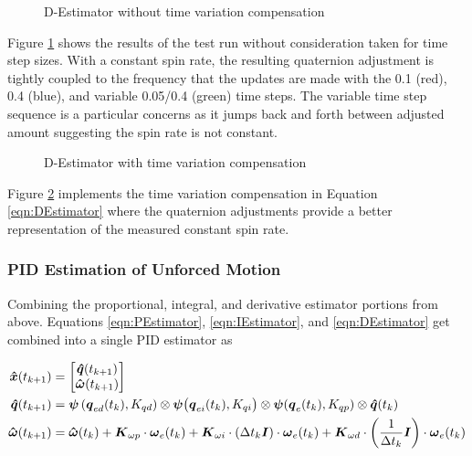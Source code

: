 \begin{figure}[H]
  \centerline{}
  \caption{D-Estimator without time variation compensation}
  \label{fig:DEstimatorwithouttimevariationcompensation}
\end{figure}

Figure \ref{fig:DEstimatorwithouttimevariationcompensation} shows the results of the test run without consideration taken for time step sizes.  With a constant spin rate, the resulting quaternion adjustment is tightly coupled to the frequency that the updates are made with the 0.1 (red), 0.4 (blue), and variable 0.05/0.4 (green) time steps.  The variable time step sequence is a particular concerns as it jumps back and forth between adjusted amount suggesting the spin rate is not constant.

\begin{figure}[H]
  \centerline{}
  \caption{D-Estimator with time variation compensation}
  \label{fig:DEstimatorwithtimevariationcompensation}
\end{figure}

Figure \ref{fig:DEstimatorwithtimevariationcompensation} implements the time variation compensation in Equation \ref{eqn:DEstimator} where the quaternion adjustments provide a better representation of the measured constant spin rate.

\subsubsection{PID Estimation of Unforced Motion}
\label{subsubsec:PIDEstimatorofUnforcedMotion}

Combining the proportional, integral, and derivative estimator portions from above.  Equations \ref{eqn:PEstimator}, \ref{eqn:IEstimator}, and \ref{eqn:DEstimator} get combined into a single PID estimator as

\begin{subequations}
  \begin{align}
    \boldsymbol{\hat{x}}(t_{k+1}) &= \begin{bmatrix} \boldsymbol{\hat{q}}(t_{k+1}) \\ \boldsymbol{\hat{\omega}}(t_{k+1}) \end{bmatrix} \\
    \boldsymbol{\hat{q}}(t_{k+1}) &= \boldsymbol{\psi}\left(\boldsymbol{q}_{ed}(t_k), K_{qd}\right) \otimes \boldsymbol{\psi}\big(\boldsymbol{q}_{ei}(t_k), K_{qi}\big) \otimes \boldsymbol{\psi}(\boldsymbol{q}_e(t_{k}), K_{qp})  \otimes \boldsymbol{\hat{q}}(t_{k}) \\
    \boldsymbol{\hat{\omega}}(t_{k+1}) &= \boldsymbol{\hat{\omega}}(t_{k}) + \boldsymbol{K}_{\omega p} \cdot \boldsymbol{\omega}_e(t_{k}) + \boldsymbol{K}_{\omega i} \cdot (\Delta t_k \boldsymbol{I})\cdot \boldsymbol{\omega}_e(t_{k}) + \boldsymbol{K}_{\omega d} \cdot \left(\frac{1}{\Delta t_k} \boldsymbol{I}\right) \cdot \boldsymbol{\omega}_e(t_{k})
  \end{align}
  \label{eqn:PIDEstimatorUnforcedMotion}
\end{subequations}

